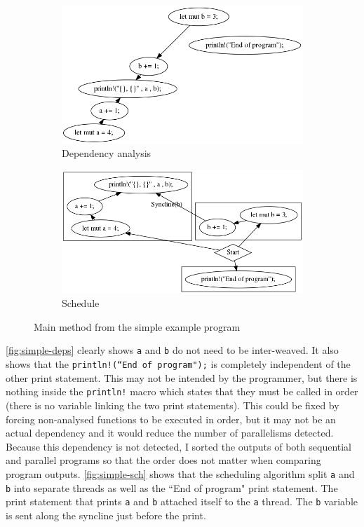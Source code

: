 \begin{figure}
    \begin{subfigure}{.5\textwidth}
        \centering
        \includegraphics[width=\textwidth]{img/simple-example/main-dependency-analysis.png}
        \caption{\label{fig:simple-deps}Dependency analysis}
    \end{subfigure}
    \begin{subfigure}{.5\textwidth}
        \centering
        \includegraphics[width=\textwidth]{img/simple-example/main-schedule.png}
        \caption{\label{fig:simple-sch}Schedule}
    \end{subfigure}
    \caption{Main method from the simple example program}
\end{figure}

\autoref{fig:simple-deps} clearly shows \texttt{a} and \texttt{b} do not need to be inter-weaved. It also shows that the \texttt{println!(``End of program");} is completely independent of the other print statement. This may not be intended by the programmer, but there is nothing inside the \texttt{println!} macro which states that they must be called in order (there is no variable linking the two print statements). This could be fixed by forcing non-analysed functions to be executed in order, but it may not be an actual dependency and it would reduce the number of parallelisms detected. Because this dependency is not detected, I sorted the outputs of both sequential and parallel programs so that the order does not matter when comparing program outputs. \autoref{fig:simple-sch} shows that the scheduling algorithm split \texttt{a} and \texttt{b} into separate threads as well as the ``End of program" print statement. The print statement that prints \texttt{a} and \texttt{b} attached itself to the \texttt{a} thread. The \texttt{b} variable is sent along the syncline just before the print.


